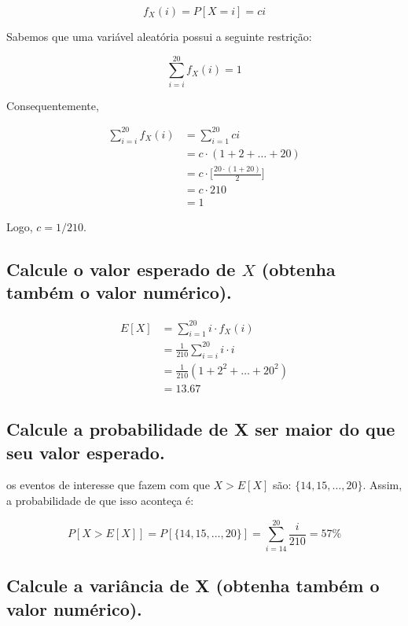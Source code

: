 \documentclass[a4paper]{article}
\begin{document}
$$f_X(i) = P[X = i] = ci$$

Sabemos que uma variável aleatória possui a seguinte restrição: 

$$\sum_{i = i}^{20} f_X(i) = 1$$

Consequentemente, 

\begin{equation*}
    \begin{split}
        \sum_{i = i}^{20} f_X(i) &= \sum_{i = 1}^{20} ci \\
            &= c\cdot(1+2+\ldots+20) \\
            &= c \cdot \Big[ \frac{20\cdot (1+20)}{2} \Big] \\
            &= c \cdot 210 \\
            &= 1
    \end{split}
\end{equation*}

Logo, $c = 1/210$.

\subsection{Calcule o valor esperado de $X$ (obtenha também o valor numérico).}

\begin{equation*}
    \begin{split}
        E[X] &= \sum_{i = 1}^{20} i\cdot f_X(i)\\
            &= \frac{1}{210} \sum_{i = i}^{20} i\cdot i\\
            &= \frac{1}{210} (1 + 2^2 + \ldots + 20^2) \\
            &= 13.67
    \end{split}
\end{equation*}

\subsection{Calcule a probabilidade de X ser maior do que seu valor esperado.}

os eventos de interesse que fazem com que $X > E[X]$ são: $\{14, 15, \ldots, 20\}$. Assim, a probabilidade de que isso aconteça é: 

$$P[X > E[X]] = P[\{14, 15, \ldots, 20\}] = \sum_{i=14}^{20} \frac{i}{210} = 57\%$$


\subsection{Calcule a variância de X (obtenha também o valor numérico).}
\end{document}

